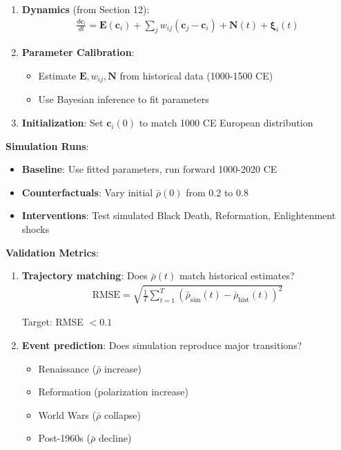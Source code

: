 \documentclass[11pt,a4paper]{article}
\theoremstyle{definition}
\theoremstyle{remark}
\newcommand{\EE}{\mathbf{E}}
\newcommand{\cc}{\mathbf{c}}
\begin{document}
\begin{small}
\begin{enumerate}
\begin{protocol}
\begin{enumerate}
    \item \textbf{Dynamics} (from Section 12):
        \begin{align}
        \frac{d\cc_i}{dt} = \EE(\cc_i) + \sum_j w_{ij}(\cc_j - \cc_i) + \mathbf{N}(t) + \boldsymbol{\xi}_i(t)
        \end{align}
    
    \item \textbf{Parameter Calibration}:
        \begin{itemize}
            \item Estimate \(\EE, w_{ij}, \mathbf{N}\) from historical data (1000-1500 CE)
            \item Use Bayesian inference to fit parameters
        \end{itemize}
    
    \item \textbf{Initialization}: Set \(\cc_i(0)\) to match 1000 CE European distribution
\end{enumerate}

\textbf{Simulation Runs}:
\begin{itemize}
    \item \textbf{Baseline}: Use fitted parameters, run forward 1000-2020 CE
    \item \textbf{Counterfactuals}: Vary initial \(\bar{\rho}(0)\) from 0.2 to 0.8
    \item \textbf{Interventions}: Test simulated Black Death, Reformation, Enlightenment shocks
\end{itemize}

\textbf{Validation Metrics}:
\begin{enumerate}
    \item \textbf{Trajectory matching}: Does \(\bar{\rho}(t)\) match historical estimates?
        \begin{align}
        \text{RMSE} = \sqrt{\frac{1}{T}\sum_{t=1}^T (\bar{\rho}_{\text{sim}}(t) - \bar{\rho}_{\text{hist}}(t))^2}
        \end{align}
        
        Target: RMSE \(< 0.1\)
    
    \item \textbf{Event prediction}: Does simulation reproduce major transitions?
        \begin{itemize}
            \item Renaissance (\(\bar{\rho}\) increase)
            \item Reformation (polarization increase)
            \item World Wars (\(\bar{\rho}\) collapse)
            \item Post-1960s (\(\bar{\rho}\) decline)
        \end{itemize}
    

\end{enumerate}
\end{protocol}
\end{enumerate}
\end{small}
\end{document}
